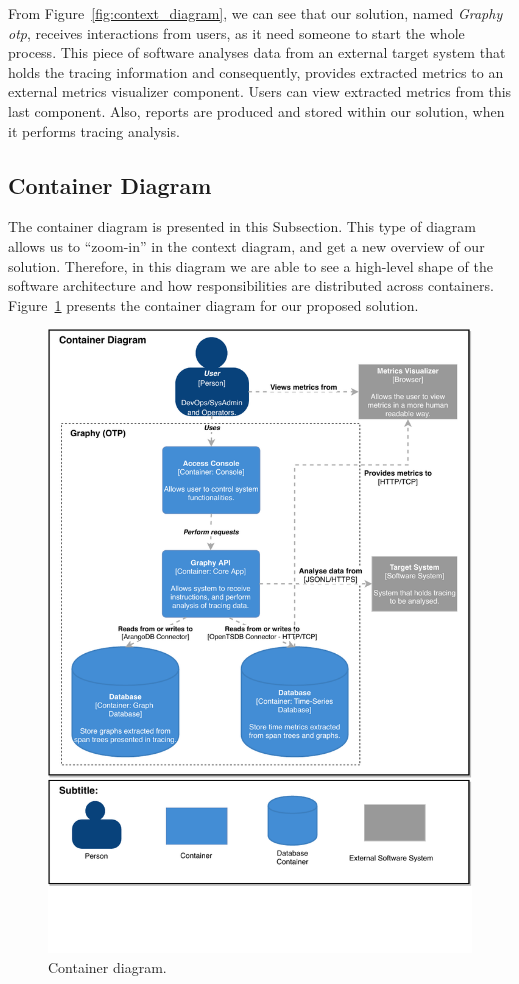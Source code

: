 From Figure~\ref{fig:context_diagram}, we can see that our solution, named \emph{Graphy \gls{otp}}, receives interactions from users, as it need someone to start the whole process. This piece of software analyses data from an external target system that holds the tracing information and consequently, provides extracted metrics to an external metrics visualizer component. Users can view extracted metrics from this last component. Also, reports are produced and stored within our solution, when it performs tracing analysis. 

\subsection{Container Diagram}
\label{subsec:container_diagram}

The container diagram is presented in this Subsection. This type of diagram allows us to ``zoom-in'' in the context diagram, and get a new overview of our solution. Therefore, in this diagram we are able to see a high-level shape of the software architecture and how responsibilities are distributed across containers. Figure~\ref{fig:container_diagram} presents the container diagram for our proposed solution.

\begin{figure}[H]
    \centering
    \includegraphics[width=1.00\textwidth]{images/container_diagram.pdf}
    \caption{Container diagram.}
    \label{fig:container_diagram}
\end{figure}

